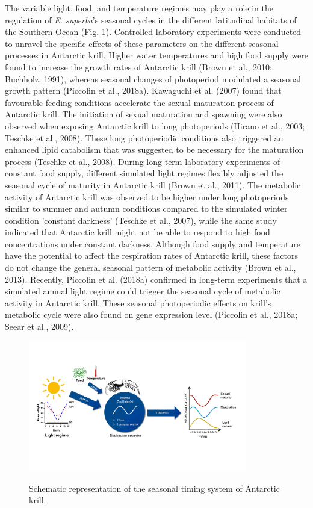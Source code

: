 The variable light, food, and temperature regimes may play a role in the
regulation of \textit{E. superba}'s seasonal cycles in the different latitudinal
habitats of the Southern Ocean (Fig. \ref{figure3}). Controlled laboratory experiments were
conducted to unravel the specific effects of these parameters on the different
seasonal processes in Antarctic krill. Higher water temperatures and high food
supply were found to increase the growth rates of Antarctic krill (Brown et
al., 2010; Buchholz, 1991), whereas seasonal changes of photoperiod modulated a
seasonal growth pattern (Piccolin et al., 2018a). Kawaguchi et al. (2007) found
that favourable feeding conditions accelerate the sexual maturation process of
Antarctic krill. The initiation of sexual maturation and spawning were also
observed when exposing Antarctic krill to long photoperiods (Hirano et al.,
2003; Teschke et al., 2008). These long photoperiodic conditions also triggered
an enhanced lipid catabolism that was suggested to be necessary for the
maturation process (Teschke et al., 2008). During long-term laboratory
experiments of constant food supply, different simulated light regimes flexibly
adjusted the seasonal cycle of maturity in Antarctic krill (Brown et al.,
2011). The metabolic activity of Antarctic krill was observed to be higher
under long photoperiods similar to summer and autumn conditions compared to the
simulated winter condition 'constant darkness' (Teschke et al., 2007), while
the same study indicated that Antarctic krill might not be able to respond to
high food concentrations under constant darkness. Although food supply and
temperature have the potential to affect the respiration rates of Antarctic
krill, these factors do not change the general seasonal pattern of metabolic
activity (Brown et al., 2013). Recently, Piccolin et al. (2018a) confirmed in
long-term experiments that a simulated annual light regime could trigger the
seasonal cycle of metabolic activity in Antarctic krill. These seasonal
photoperiodic effects on krill's metabolic cycle were also found on gene
expression level (Piccolin et al., 2018a; Seear et al., 2009). 


\begin{figure}
        \caption{Schematic representation of the seasonal timing system of Antarctic krill.}
        \centering
        \includegraphics[width=0.85\textwidth]{../Figures/Figure3.pdf}
        \label{figure3}
\end{figure}

